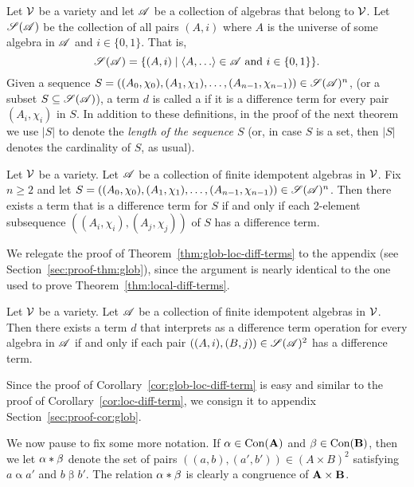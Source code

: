 Let $\mathcal{V}$ be a variety and let $\mathscr{A}$ be a collection of algebras that belong to $\mathcal{V}$.
Let $\mathscr{S}(\mathscr{A})$ be the collection of all pairs $(A, i)$ where $A$ is the universe
of some algebra in $\mathscr{A}$ and $i\in \{0,1\}$.  That is,
\[
\scS(\scA) = \{(A, i) \mid \<A, \dots\> \in \scA \text{ and } i \in \{0,1\}\}.
\]
Given a sequence
$S = ((A_0, \chi_0), (A_1, \chi_1), \dots,
(A_{n-1},\chi_{n-1})) \in \mathscr{S}(\mathscr{A})^n$,
(or a subset $S \subseteq \mathscr{S}(\mathscr{A})$),
a term $d$ is called a 
if it is a \glocal difference term for every pair $(A_i, \chi_i)$ in $S$.
In addition to these definitions, in the proof of the next theorem we use
$|S|$ to denote the \emph{length of the sequence $S$}
(or, in case $S$ is a set, then $|S|$ denotes the cardinality of $S$, as usual).
\begin{thm}
  \label{thm:glob-loc-diff-terms}
  Let $\mathcal{V}$ be a variety.  Let $\mathscr{A}$ be a collection of finite idempotent
  algebras in $\mathcal{V}$. Fix $n\geq 2$ and 
  let $S= ((A_0, \chi_0), (A_1, \chi_1), \dots, (A_{n-1}, \chi_{n-1}))\in \mathscr{S}(\mathscr{A})^n$.
  Then there exists a term that is a \glocal difference term for $S$
  if and only if each 2-element subsequence $((A_i,\chi_i), (A_j,\chi_j))$ of $S$
  has a \glocal difference term.
\end{thm}
We relegate the proof of Theorem~\ref{thm:glob-loc-diff-terms} 
to the appendix (see Section~\ref{sec:proof-thm:glob}), since the argument 
is nearly identical to the one used to prove Theorem~\ref{thm:local-diff-terms}. 

\begin{cor}
  \label{cor:glob-loc-diff-term}
  Let $\mathcal{V}$ be a variety.  Let $\mathscr{A}$ be a collection of finite idempotent
  algebras in $\mathcal{V}$. %
  Then there exists a term $d$ that interprets as a difference term operation
  for every algebra in $\mathscr{A}$
  if and only if each pair $((A,i), (B,j)) \in \mathscr{S}(\mathscr{A})^2$ has a \glocal
  difference term.
\end{cor}
Since the proof of Corollary~\ref{cor:glob-loc-diff-term}
is easy and similar to the proof
of Corollary~\ref{cor:loc-diff-term}, we consign it to 
appendix Section~\ref{sec:proof-cor:glob}.

We now pause to fix some more notation.
If $\alpha \in \operatorname{Con}(\mathbf{A})$ and $\beta \in \operatorname{Con}(\mathbf{B})$, then we let
$\alpha \ast \beta$ denote the set of pairs $((a,b),(a',b'))\in (A\times B)^2$ satisfying
$a \mathrel{\alpha} a'$ and $b \mathrel{\beta} b'$.  The relation 
$\alpha \ast \beta$ is clearly a congruence of $\mathbf{A} \times \mathbf{B}$.

